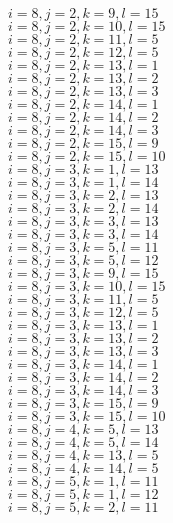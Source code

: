 \documentclass[14pt]{article}
\begin{document}
    $i=8,j=2,k=9,l=15 $ \\ 
    $i=8,j=2,k=10,l=15 $ \\ 
    $i=8,j=2,k=11,l=5 $ \\ 
    $i=8,j=2,k=12,l=5 $ \\ 
    $i=8,j=2,k=13,l=1 $ \\ 
    $i=8,j=2,k=13,l=2 $ \\ 
    $i=8,j=2,k=13,l=3 $ \\ 
    $i=8,j=2,k=14,l=1 $ \\ 
    $i=8,j=2,k=14,l=2 $ \\ 
    $i=8,j=2,k=14,l=3 $ \\ 
    $i=8,j=2,k=15,l=9 $ \\ 
    $i=8,j=2,k=15,l=10 $ \\ 
    $i=8,j=3,k=1,l=13 $ \\ 
    $i=8,j=3,k=1,l=14 $ \\ 
    $i=8,j=3,k=2,l=13 $ \\ 
    $i=8,j=3,k=2,l=14 $ \\ 
    $i=8,j=3,k=3,l=13 $ \\ 
    $i=8,j=3,k=3,l=14 $ \\ 
    $i=8,j=3,k=5,l=11 $ \\ 
    $i=8,j=3,k=5,l=12 $ \\ 
    $i=8,j=3,k=9,l=15 $ \\ 
    $i=8,j=3,k=10,l=15 $ \\ 
    $i=8,j=3,k=11,l=5 $ \\ 
    $i=8,j=3,k=12,l=5 $ \\ 
    $i=8,j=3,k=13,l=1 $ \\ 
    $i=8,j=3,k=13,l=2 $ \\ 
    $i=8,j=3,k=13,l=3 $ \\ 
    $i=8,j=3,k=14,l=1 $ \\ 
    $i=8,j=3,k=14,l=2 $ \\ 
    $i=8,j=3,k=14,l=3 $ \\ 
    $i=8,j=3,k=15,l=9 $ \\ 
    $i=8,j=3,k=15,l=10 $ \\ 
    $i=8,j=4,k=5,l=13 $ \\ 
    $i=8,j=4,k=5,l=14 $ \\ 
    $i=8,j=4,k=13,l=5 $ \\ 
    $i=8,j=4,k=14,l=5 $ \\ 
    $i=8,j=5,k=1,l=11 $ \\ 
    $i=8,j=5,k=1,l=12 $ \\ 
    $i=8,j=5,k=2,l=11 $ \\ 
\end{document}
